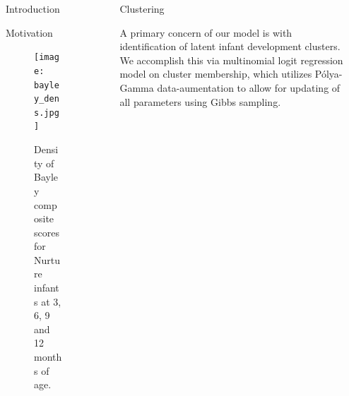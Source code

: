 \documentclass[final]{beamer}
\newlength{\sepwid}
\newlength{\onecolwid}
\newlength{\twocolwid}
\begin{document}
\begin{frame}[t]
\begin{columns}[t]
\begin{column}{\onecolwid}
\begin{block}{Introduction}
\end{block}


\begin{block}{Motivation}
\begin{figure}
\texttt{[image: bayley\_dens.jpg]}
\caption{Density of Bayley composite scores for Nurture infants at 3, 6, 9 and 12 months of age.}
\end{figure}
\end{block}


\end{column} %

\begin{column}{\sepwid}\end{column} %

\begin{column}{\twocolwid} %

\begin{columns}[t,totalwidth=\twocolwid] %

\begin{column}{\onecolwid}\vspace{-.6in} %

%	

\begin{block}{Clustering}

A primary concern of our model is with identification of latent infant development clusters. We accomplish this via multinomial logit regression model on cluster membership, which utilizes P\'{o}lya-Gamma data-aumentation to allow for updating of all parameters using Gibbs sampling.

\end{block}


\end{column} %

\begin{column}{\onecolwid}\vspace{-.6in} %


\end{column}
\end{columns}
\end{column}
\end{columns}
\end{frame}
\end{document}
